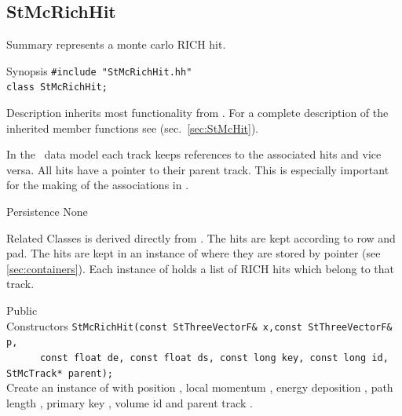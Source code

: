 \subsection{StMcRichHit}
 
\label{sec:StMcRichHit}
\begin{Entry}
\item[Summary]
     represents a monte carlo RICH hit.

\item[Synopsis]
    \verb+#include "StMcRichHit.hh"+\\
    \verb+class StMcRichHit;+\\

\item[Description]    
     inherits most functionality from .
    For a complete description of the inherited member functions see
     (sec.~\ref{sec:StMcHit}).

    In the \StMcEvent\ data model each track keeps references to the
    associated hits and vice versa. All hits have a pointer to their
    parent track.  This is especially important for the making of the
    associations in \StAssociationMaker. 
    
    
    
\item[Persistence]
    None

\item[Related Classes]
     is derived directly from .
    The hits are kept according to row and pad.
    The hits are kept in an instance of 
    where they are stored by pointer (see \ref{sec:containers}).
    Each instance of  holds a list of RICH hits
    which belong to that track.

\item[Public\\ Constructors]
    \verb+StMcRichHit(const StThreeVectorF& x,const StThreeVectorF& p,+\\
    \verb+      const float de, const float ds, const long key, const long id, StMcTrack* parent);+\\
    
    Create an instance of  with position , local momentum ,
    energy deposition , path length , primary key ,
    volume id  and parent track .  


\end{Entry}
